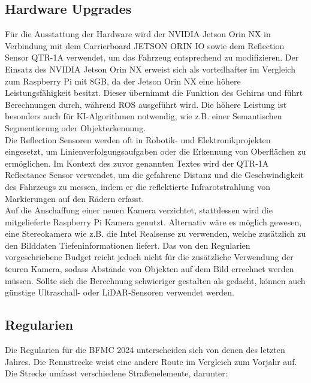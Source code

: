 \newpage
\subsection{Hardware Upgrades}

Für die Ausstattung der Hardware wird der NVIDIA Jetson Orin NX \cite{jetson-orinNX} in Verbindung mit dem Carrierboard JETSON ORIN IO \cite{jetson-orinIO} sowie dem Reflection Sensor QTR-1A\cite{reflection-sensor} verwendet, um das Fahrzeug entsprechend zu modifizieren. Der Einsatz des NVIDIA Jetson Orin NX erweist sich als vorteilhafter im Vergleich zum Raspberry Pi mit 8GB, da der Jetson Orin NX eine höhere Leistungsfähigkeit besitzt. Dieser übernimmt die Funktion des Gehirns und führt Berechnungen durch, während \gls{ROS} ausgeführt wird. 
Die höhere Leistung ist besonders auch für KI-Algorithmen notwendig, wie z.B. einer Semantischen Segmentierung oder Objekterkennung.\\

Die Reflection Sensoren werden oft in Robotik- und Elektronikprojekten eingesetzt, um Linienverfolgungsaufgaben oder die Erkennung von Oberflächen zu ermöglichen. Im Kontext des zuvor genannten Textes wird der QTR-1A Reflectance Sensor verwendet, um die gefahrene Distanz und die Geschwindigkeit des Fahrzeugs zu messen, indem er die reflektierte Infrarotstrahlung von Markierungen auf den Rädern erfasst.\\

Auf die Anschaffung einer neuen Kamera verzichtet, stattdessen wird die mitgelieferte Raspberry Pi Kamera genutzt.
Alternativ wäre es möglich gewesen, eine Stereokamera wie z.B. die Intel Realsense\cite{intel-realsense} zu verwenden, welche zusätzlich zu den Bilddaten Tiefeninformationen liefert.
Das von den Regularien vorgeschriebene Budget reicht jedoch nicht für die zusätzliche Verwendung der teuren Kamera, sodass Abstände von Objekten auf dem Bild errechnet werden müssen.
Sollte sich die Berechnung schwieriger gestalten als gedacht, können auch günstige Ultraschall- oder LiDAR-Sensoren verwendet werden.

\newpage
\subsection{Regularien}

Die Regularien für die \gls{BFMC} 2024 unterscheiden sich von denen des letzten Jahres. Die Rennstrecke weist eine andere Route im Vergleich zum Vorjahr auf. Die Strecke umfasst verschiedene Straßenelemente, darunter:

